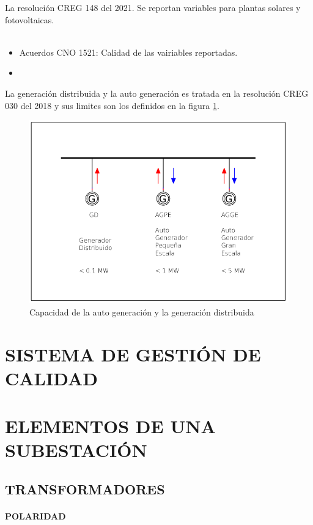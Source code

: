 \documentclass[a5paper]{book}%
\begin{document}
La resolución CREG 148 del 2021. Se reportan variables para plantas
solares y fotovoltaicas.\\\\

\begin{itemize}
\item Acuerdos CNO 1521: Calidad de las vairiables reportadas.
\item
\end{itemize}

La generación distribuida  y la auto generación es tratada en la resolución CREG 030 del 2018 y sus limites son los definidos en la figura \ref{fig:gd}.

\begin{figure}[H]
	\centering
	\includegraphics[width=0.7\linewidth]{gd}
	\caption{Capacidad de la auto generación y la generación distribuida}
	\label{fig:gd}
      \end{figure}
      
\chapter{SISTEMA DE GESTIÓN DE CALIDAD}

\chapter{ELEMENTOS DE UNA SUBESTACIÓN}

\section{TRANSFORMADORES}
\subsubsection{POLARIDAD}
\end{document}
